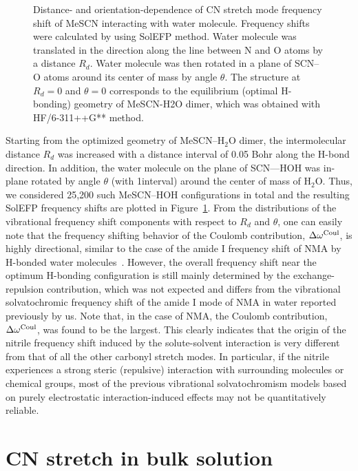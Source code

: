 \documentclass[a4paper,titlepage,twoside,fleqn,12pt]{book}
\begin{document}
\begin{refsection}
\begin{figure}[t!]
\setlength\fboxsep{0.4pt}
\setlength\fboxrule{0.5pt}
\caption{
Distance- and orientation\hyp{}dependence of CN stretch mode frequency shift of MeSCN interacting with water
molecule. Frequency shifts were calculated by using SolEFP method. Water molecule was translated in the
direction along the line between N and O atoms by a distance $R_d$. Water molecule was then rotated in a
plane of SCN--O atoms around its center of mass by angle $\theta$. The structure at $R_d=0$ and $\theta=0$ corresponds to
the equilibrium (optimal H-bonding) geometry of MeSCN-H2O dimer, which was obtained with
HF/6-311++G** method.
\label{f:mescn-scan}}
\end{figure}
%
Starting from the optimized geometry of MeSCN--H$_2$O
dimer, the intermolecular distance $R_d$ was increased with
a distance interval of 0.05 Bohr along the H-bond direction. In
addition, the water molecule on the plane of SCN---HOH was
in\hyp{}plane rotated by angle $\theta$ (with 1\textdegree interval) around the center
of mass of H$_2$O. Thus, we considered 25,200 such
MeSCN--HOH configurations in total and the resulting SolEFP
frequency shifts are plotted in Figure~\ref{f:mescn-scan}. From the distributions
of the vibrational frequency shift components with respect to
$R_d$ and $\theta$, one can easily note that the frequency shifting
behavior of the Coulomb contribution, $\Delta\omega^{\rm Coul}$, is highly
directional, similar to the case of the amide I frequency shift of
NMA by H-bonded water molecules~\citep{Blasiak.Cho.JCP.2015}. 
However, the overall
frequency shift near the optimum H-bonding configuration is
still mainly determined by the exchange\hyp{}repulsion
contribution, which was not expected and differs from the
vibrational solvatochromic frequency shift of the amide I mode
of NMA in water reported previously by us.\citep{Blasiak.Cho.JCP.2014,Blasiak.Cho.JCP.2015} 
Note that, in
the case of NMA, the Coulomb contribution, $\Delta\omega^{\rm Coul}$, was found
to be the largest. This clearly indicates that the origin of the
nitrile frequency shift induced by the solute\hyp{}solvent
interaction is very different from that of all the other carbonyl
stretch modes. In particular, if the nitrile experiences a strong
steric (repulsive) interaction with surrounding molecules or
chemical groups, most of the previous vibrational
solvatochromism models based on purely electrostatic
interaction\hyp{}induced effects may not be quantitatively reliable.



\section{CN stretch in bulk solution\label{s:dw-cn-bulk}}


\end{refsection}
\end{document}
